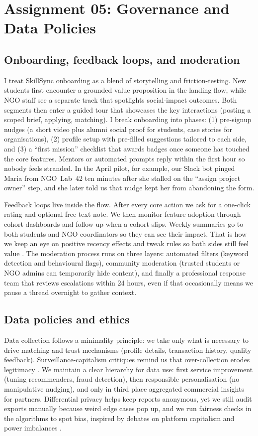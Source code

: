 \section*{Assignment 05: Governance and Data Policies}

\subsection*{Onboarding, feedback loops, and moderation}
I treat SkillSync onboarding as a blend of storytelling and friction-testing. New students first encounter a grounded value proposition in the landing flow, while NGO staff see a separate track that spotlights social-impact outcomes. Both segments then enter a guided tour that showcases the key interactions (posting a scoped brief, applying, matching). I break onboarding into phases: (1) pre-signup nudges (a short video plus alumni social proof for students, case stories for organisations), (2) profile setup with pre-filled suggestions tailored to each side, and (3) a ``first mission'' checklist that awards badges once someone has touched the core features. Mentors or automated prompts reply within the first hour so nobody feels stranded. In the April pilot, for example, our Slack bot pinged Maria from NGO~Lab~42 ten minutes after she stalled on the ``assign project owner'' step, and she later told us that nudge kept her from abandoning the form.

Feedback loops live inside the flow. After every core action we ask for a one-click rating and optional free-text note. We then monitor feature adoption through cohort dashboards and follow up when a cohort slips. Weekly summaries go to both students and NGO coordinators so they can see their impact. That is how we keep an eye on positive recency effects and tweak rules so both sides still feel value \citep{Reillier2017}. The moderation process runs on three layers: automated filters (keyword detection and behavioural flags), community moderation (trusted students or NGO admins can temporarily hide content), and finally a professional response team that reviews escalations within 24 hours, even if that occasionally means we pause a thread overnight to gather context.

\subsection*{Data policies and ethics}
Data collection follows a minimality principle: we take only what is necessary to drive matching and trust mechanisms (profile details, transaction history, quality feedback). Surveillance-capitalism critiques remind us that over-collection erodes legitimacy \citep{Zuboff2019}. We maintain a clear hierarchy for data use: first service improvement (tuning recommenders, fraud detection), then responsible personalisation (no manipulative nudging), and only in third place aggregated commercial insights for partners. Differential privacy helps keep reports anonymous, yet we still audit exports manually because weird edge cases pop up, and we run fairness checks in the algorithms to spot bias, inspired by debates on platform capitalism and power imbalances \citep{Srnicek2017}.

